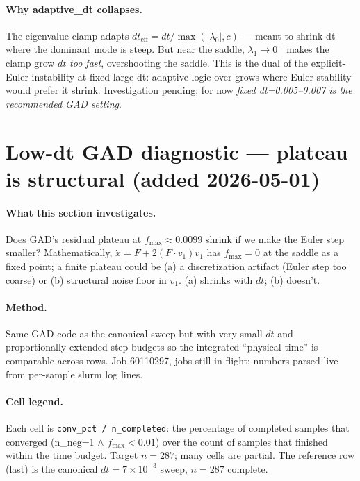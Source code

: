 \documentclass[11pt]{article}
\begin{document}
\paragraph{Why adaptive\_dt collapses.} The eigenvalue-clamp adapts
$dt_{\text{eff}}{=}dt/\!\max(|\lambda_0|, c)$ — meant to shrink dt
where the dominant mode is steep. But near the saddle, $\lambda_1\to 0^-$
makes the clamp grow $dt$ \emph{too fast}, overshooting the saddle.
This is the dual of the explicit-Euler instability at fixed large dt:
adaptive logic over-grows where Euler-stability would prefer it shrink.
Investigation pending; for now \emph{fixed dt=0.005--0.007 is the
recommended GAD setting}.

\newpage
\section{Low-dt GAD diagnostic — plateau is structural (added 2026-05-01)}

\paragraph{What this section investigates.} Does GAD's residual plateau
at $f_{\max}\approx0.0099$ shrink if we make the Euler step smaller?
Mathematically, $\dot x = F + 2(F\!\cdot\!v_1)v_1$ has $f_{\max}{=}0$ at
the saddle as a fixed point; a finite plateau could be (a) a
discretization artifact (Euler step too coarse) or (b) structural noise
floor in $v_1$. (a) shrinks with $dt$; (b) doesn't.

\paragraph{Method.} Same GAD code as the canonical sweep but with very
small $dt$ and proportionally extended step budgets so the integrated
``physical time'' is comparable across rows. Job 60110297, jobs still
in flight; numbers parsed live from per-sample slurm log lines.

\paragraph{Cell legend.} Each cell is \texttt{conv\_pct / n\_completed}:
the percentage of completed samples that converged
(n\_neg=1 $\wedge$ $f_{\max}{<}0.01$) over the count of samples that
finished within the time budget. Target $n=287$; many cells are partial.
The reference row (last) is the canonical $dt{=}7\!\times\!10^{-3}$
sweep, $n=287$ complete.
\end{document}

